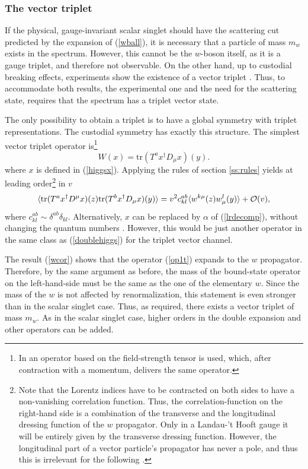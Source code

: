 \documentclass[final,twoside,12pt]{article}
\newcommand*{\no}{\noindent}
\newcommand*{\be}{\begin{equation}}
\newcommand*{\ee}{\end{equation}}
\newcommand*{\pref}[1]{(\ref{#1})}
\newcommand*{\tr}{\mathrm{tr}}
\newcommand*{\1}{1\!\!\!\bot}
\begin{document}
\subsubsection{The vector triplet}

If the physical, gauge-invariant scalar singlet should have the scattering cut predicted by the expansion of \pref{wball}, it is necessary that a particle of mass $m_w$ exists in the spectrum. However, this cannot be the $w$-boson itself, as it is a gauge triplet, and therefore not observable. On the other hand, up to custodial breaking effects, experiments show the existence of a vector triplet \cite{pdg}. Thus, to accommodate both results, the experimental one and the need for the scattering state, requires that the spectrum has a triplet vector state.

The only possibility to obtain a triplet is to have a global symmetry with triplet representations. The custodial symmetry has exactly this structure. The simplest vector triplet operator is\footnote{In \cite{Frohlich:1980gj,Frohlich:1981yi} an operator based on the field-strength tensor is used, which, after contraction with a momentum, delivers the same operator.} \cite{'tHooft:1979bj,Evertz:1985fc,Maas:2012tj,Maas:2013aia}
\be
W(x)=\tr\left(T^ax^\dagger D_\mu x\right)(y)\label{op1t}.
\ee
\no where $x$ is defined in \pref{higgsx}. Applying the rules of section \ref{ss:rules} yields at leading order\footnote{Note that the Lorentz indices have to be contracted on both sides to have a non-vanishing correlation function. Thus, the correlation-function on the right-hand side is a combination of the transverse and the longitudinal dressing function of the $w$ propagator. Only in a Landau-'t Hooft gauge it will be entirely given by the transverse dressing function. However, the longitudinal part of a vector particle's propagator has never a pole, and thus this is irrelevant for the following \cite{Raubitzek:unpublished}.} in $v$
\be
\langle\tr(T^ax^\dagger D^\mu x)(z)\tr(T^bx^\dagger D_\mu x)(y)\rangle=
v^2c^{ab}_{kl}\langle w^{k\mu}(z) w^l_\mu(y)\rangle+{\cal O}(v)\label{wcor},
\ee
\no where  $c^{ab}_{kl}\sim\delta^{ab}\delta_{kl}$. Alternatively, $x$ can be replaced by $\alpha$ of \pref{lrdecomp}, without changing the quantum numbers \cite{Evertz:1985fc}. However, this would be just another operator in the same class as \pref{doublehiggs} for the triplet vector channel.

The result \pref{wcor} shows that the operator \pref{op1t} expands to the $w$ propagator. Therefore, by the same argument as before, the mass of the bound-state operator on the left-hand-side must be the same as the one of the elementary $w$. Since the mass of the $w$ is not affected by renormalization, this statement is even stronger than in the scalar singlet case. Thus, as required, there exists a vector triplet of mass $m_w$. As in the scalar singlet case, higher orders in the double expansion and other operators can be added.
\end{document}
